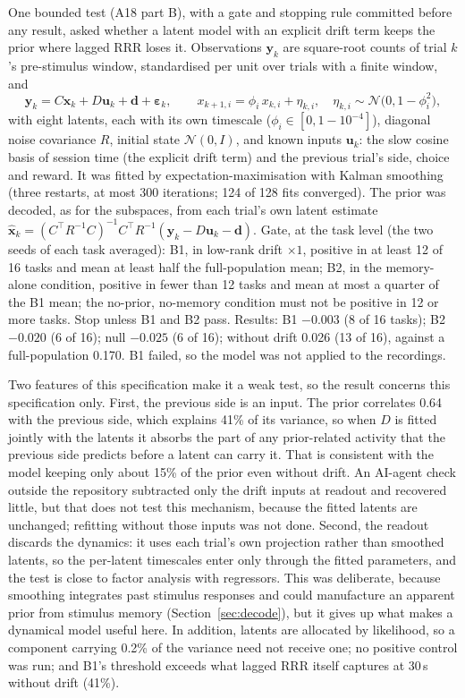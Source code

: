 \documentclass{article}
\newcommand{\bm}[1]{\boldsymbol{#1}}
\begin{document}
One bounded test (A18 part B), with a gate and stopping rule committed before any result, asked whether a latent model
with an explicit drift term keeps the prior where lagged RRR loses it. Observations $\bm y_k$ are square-root counts of
trial $k$'s pre-stimulus window, standardised per unit over trials with a finite window, and
\begin{equation}
  \bm y_k = C \bm x_k + D \bm u_k + \bm d + \bm\varepsilon_k , \qquad
  x_{k+1,i} = \phi_i\, x_{k,i} + \eta_{k,i} , \quad \eta_{k,i} \sim \mathcal N\big(0, 1 - \phi_i^2\big) ,
\end{equation}
with eight latents, each with its own timescale ($\phi_i \in [0, 1-10^{-4}]$), diagonal noise covariance $R$, initial
state $\mathcal N(0, I)$, and known inputs $\bm u_k$: the slow cosine basis of session time (the explicit drift term)
and the previous trial's side, choice and reward. It was fitted by expectation-maximisation with Kalman smoothing
(three restarts, at most 300 iterations; 124 of 128 fits converged). The prior was decoded, as for the subspaces, from
each trial's own latent estimate $\hat{\bm x}_k = (C^\top R^{-1} C)^{-1} C^\top R^{-1} (\bm y_k - D \bm u_k - \bm d)$.
Gate, at the task level (the two seeds of each task averaged): B1, in low-rank drift $\times 1$, positive in at least
12 of 16 tasks and mean at least half the full-population mean; B2, in the memory-alone condition, positive in fewer
than 12 tasks and mean at most a quarter of the B1 mean; the no-prior, no-memory condition must not be positive in 12
or more tasks. Stop unless B1 and B2 pass. Results: B1 $-0.003$ (8 of 16 tasks); B2 $-0.020$ (6 of 16); null
$-0.025$ (6 of 16); without drift 0.026 (13 of 16), against a full-population 0.170. B1 failed, so the model was not
applied to the recordings.

Two features of this specification make it a weak test, so the result concerns this specification only. First, the
previous side is an input. The prior correlates 0.64 with the previous side, which explains 41\% of its variance, so
when $D$ is fitted jointly with the latents it absorbs the part of any prior-related activity that the previous side
predicts before a latent can carry it. That is consistent with the model keeping only about 15\% of the prior even
without drift. An AI-agent check outside the repository subtracted only the drift inputs at readout and recovered
little, but that does not test this mechanism, because the fitted latents are unchanged; refitting without those
inputs was not done. Second, the readout discards the dynamics: it uses each trial's own projection rather than
smoothed latents, so the per-latent timescales enter only through the fitted parameters, and the test is close to
factor analysis with regressors. This was deliberate, because smoothing integrates past stimulus responses and could
manufacture an apparent prior from stimulus memory (Section~\ref{sec:decode}), but it gives up what makes a dynamical
model useful here. In addition, latents are allocated by likelihood, so a component carrying 0.2\% of the variance need
not receive one; no positive control was run; and B1's threshold exceeds what lagged RRR itself captures at 30\,s
without drift (41\%).
\end{document}
